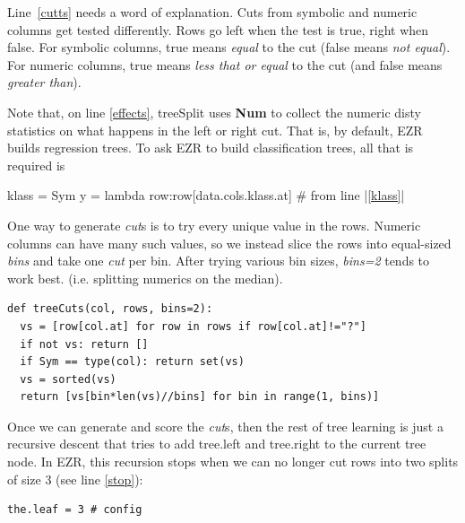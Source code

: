 \documentclass[AMA,STIX2COL]{WileyNJDv5}
\newcommand{\cls}[1]{%
  \setlength{\fboxsep}{1.5pt}%
  \colorbox{clsbg}{\sffamily\bfseries{#1}}%
}
\begin{document}
{Line~\ref{cutts} needs a word of explanation.
Cuts from symbolic and numeric columns get tested differently. Rows go left when the test is true, right when false. For symbolic columns, true means {\em equal} to the cut (false means 
{\em not equal}). For numeric columns, true means {\em less that or equal} to  the cut (and false means {\em greater than}).

Note that, on  line \ref{effects}, \textsf{treeSplit}   uses \cls{Num} to  
collect the numeric  \textsf{disty} statistics on what happens in the left or right cut. That is, by default, EZR builds regression trees.
To ask EZR to build classification
trees, all that is required is  
\begin{repl}
klass = Sym
y = lambda row:row[data.cols.klass.at] # from line |\ref{klass}|
\end{repl}
One way to generate {\em cut}s is to try every unique value in the rows. Numeric columns can have many such values, so we instead slice the rows into equal-sized 
{\em bins} and take one 
{\em cut} per bin. After trying  various bin sizes,
 {\em bins=2} tends to work best.
(i.e. splitting numerics on the median).
\begin{verbatim}
def treeCuts(col, rows, bins=2):
  vs = [row[col.at] for row in rows if row[col.at]!="?"]
  if not vs: return []
  if Sym == type(col): return set(vs)
  vs = sorted(vs)
  return [vs[bin*len(vs)//bins] for bin in range(1, bins)]
\end{verbatim}
Once we can generate and score the {\em cut}s, then the rest of tree learning is just
a recursive descent that tries to add \textsf{tree.left} and \textsf{tree.right} to the
current \textsf{tree} node.  In EZR, this recursion stops when
we can no longer cut rows into two splits of size 3 (see line \ref{stop}):
\begin{verbatim}
the.leaf = 3 # config


\end{verbatim}}
\end{document}

